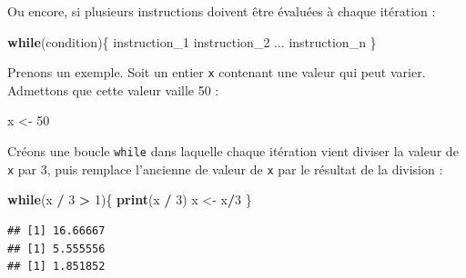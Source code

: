 \documentclass[
  11pt,
]{book}
\newenvironment{Shaded}{\begin{snugshade}}{\end{snugshade}}
\newcommand{\ControlFlowTok}[1]{\textcolor[rgb]{0.13,0.29,0.53}{\textbf{#1}}}
\newcommand{\DecValTok}[1]{\textcolor[rgb]{0.00,0.00,0.81}{#1}}
\newcommand{\FunctionTok}[1]{\textcolor[rgb]{0.13,0.29,0.53}{\textbf{#1}}}
\newcommand{\NormalTok}[1]{#1}
\newcommand{\OtherTok}[1]{\textcolor[rgb]{0.56,0.35,0.01}{#1}}
\newcommand{\SpecialCharTok}[1]{\textcolor[rgb]{0.81,0.36,0.00}{\textbf{#1}}}
\numberwithin{equation}{section}
\numberwithin{countremarque}{section}
\begin{document}
Ou encore, si plusieurs instructions doivent être évaluées à chaque itération :

\begin{Shaded}
\begin{Highlighting}[]
\ControlFlowTok{while}\NormalTok{(condition)\{}
\NormalTok{  instruction\_1}
\NormalTok{  instruction\_2}
\NormalTok{  ...}
\NormalTok{  instruction\_n}
\NormalTok{\}}
\end{Highlighting}
\end{Shaded}

Prenons un exemple. Soit un entier \texttt{x} contenant une valeur qui peut varier. Admettons que cette valeur vaille 50 :

\begin{Shaded}
\begin{Highlighting}[]
\NormalTok{x }\OtherTok{\textless{}{-}} \DecValTok{50}
\end{Highlighting}
\end{Shaded}

Créons une boucle \texttt{while} dans laquelle chaque itération vient diviser la valeur de \texttt{x} par 3, puis remplace l'ancienne de valeur de \texttt{x} par le résultat de la division :

\begin{Shaded}
\begin{Highlighting}[]
\ControlFlowTok{while}\NormalTok{(x }\SpecialCharTok{/} \DecValTok{3} \SpecialCharTok{\textgreater{}} \DecValTok{1}\NormalTok{)\{}
  \FunctionTok{print}\NormalTok{(x }\SpecialCharTok{/} \DecValTok{3}\NormalTok{)}
\NormalTok{  x }\OtherTok{\textless{}{-}}\NormalTok{ x}\SpecialCharTok{/}\DecValTok{3}
\NormalTok{\}}
\end{Highlighting}
\end{Shaded}

\begin{lstlisting}
## [1] 16.66667
## [1] 5.555556
## [1] 1.851852
\end{lstlisting}
\end{document}
